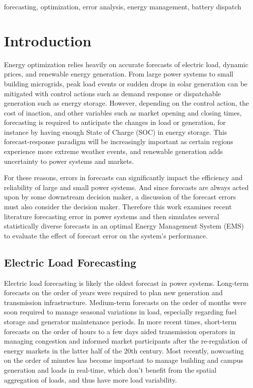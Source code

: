 \documentclass[conference]{IEEEtran}
\begin{document}
\begin{IEEEkeywords}
forecasting, optimization, error analysis, energy management, battery dispatch
\end{IEEEkeywords}

\section{Introduction}

Energy optimization relies heavily on accurate forecasts of electric load, dynamic prices, and renewable energy generation. From large power systems to small building microgrids, peak load events or sudden drops in solar generation can be mitigated with control actions such as demand response or dispatchable generation such as energy storage. However, depending on the control action, the cost of inaction, and other variables such as market opening and closing times, forecasting is required to anticipate the changes in load or generation, for instance by having enough State of Charge (SOC) in energy storage. This forecast-response paradigm will be increasingly important as certain regions experience more extreme weather events, and renewable generation adds uncertainty to power systems and markets. 

For these reasons, errors in forecasts can significantly impact the efficiency and reliability of large and small power systems. And since forecasts are always acted upon by some downstream decision maker, a discussion of the forecast errors must also consider the decision maker. Therefore this work examines recent literature forecasting error in power systems and then simulates several statistically diverse forecasts in an optimal Energy Management System (EMS) to evaluate the effect of forecast error on the system's performance.

\subsection{Electric Load Forecasting}

Electric load forecasting is likely the oldest forecast in power systems. Long-term forecasts on the order of years were required to plan new generation and transmission infrastructure. Medium-term forecasts on the order of months were soon required to manage seasonal variations in load, especially regarding fuel storage and generator maintenance periods. In more recent times, short-term forecasts on the order of hours to a few days aided transmission operators in managing congestion and informed market participants after the re-regulation of energy markets in the latter half of the 20th century. Most recently, nowcasting on the order of minutes has become important to manage building and campus generation and loads in real-time, which don't benefit from the spatial aggregation of loads, and thus have more load variability. 
\end{document}
